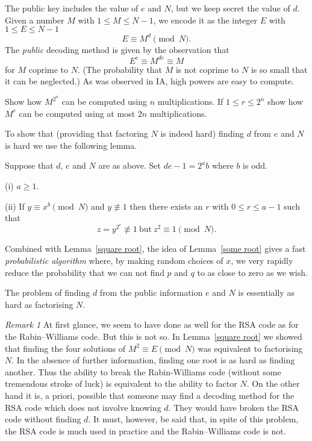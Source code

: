 The public key includes the value of $e$ and $N$,
but we keep secret the value of $d$. Given
a number $M$ with $1\leq M\leq N-1$, we encode
it as the integer $E$ with $1\leq E\leq N-1$
\[E\equiv M^{d}\pmod{N}.\]
The \emph{public} decoding method is given by the
observation that
\[E^{e}\equiv M^{de}\equiv M\]
for $M$ coprime to $N$. (The probability that
$M$ is not coprime to $N$ is so small that it
can be neglected.)
As was observed in IA, high powers are easy to compute.

\begin{exercise} Show how $M^{2^{n}}$ can be
computed using $n$ multiplications. If $1\leq r\leq 2^{n}$
show how $M^{r}$ can be computed using at most $2n$
multiplications. 
\end{exercise} 


To show that (providing that factoring $N$ is
indeed hard) finding $d$ from $e$ and $N$
is hard we use the following lemma.

\begin{lemma}\label{some root}
Suppose that $d$, $e$ and $N$ are
as above. Set $de-1=2^{a}b$ where $b$ is odd.

(i) $a\geq 1$.

(ii) If $y\equiv x^{b}\pmod{N}$ and $y\not\equiv 1$
then there exists
an $r$ with $0\leq r\leq a-1$ such that
\[z=y^{2^{r}}\not\equiv 1\ \text{but}
\ z^{2}\equiv 1\pmod{N}.\]
\end{lemma}

Combined with Lemma~\ref{square root}, the idea
of Lemma~\ref{some root} gives a fast \emph{probabilistic
algorithm} where, by making random choices of $x$,
we very rapidly reduce the probability that
we can not find $p$ and $q$ to as close to zero as we wish.
\begin{lemma}\label{L;fast probable} The problem of finding $d$
from the public information $e$ and $N$ is
essentially as hard as factorising $N$.
\end{lemma}

\emph{Remark 1} At first glance, we seem to have done as well
for the RSA code as for the Rabin--Williams code. But
this is not so. In Lemma~\ref{square root} we showed
that finding the four solutions of $M^{2}\equiv E \pmod{N}$
was equivalent to factorising $N$. In the absence
of further information, finding one root is
as hard as finding another. Thus the ability to
break the Rabin-Williams code (without some tremendous
stroke of luck) is equivalent to the ability to
factor $N$.
On the other hand it is, a priori, possible that
someone may find a decoding method
for the RSA code which does not involve knowing $d$.
They would have broken
the RSA code without finding $d$.
It must, however, be said that, in spite of this
problem, the RSA code is much used in practice
and the Rabin--Williams code is not.

